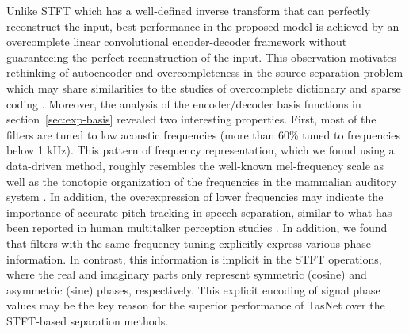 \documentclass[journal]{IEEEtran}
\begin{document}
Unlike STFT which has a well-defined inverse transform that can perfectly reconstruct the input, best performance in the proposed model is achieved by an overcomplete linear convolutional encoder-decoder framework without guaranteeing the perfect reconstruction of the input. This observation motivates rethinking of autoencoder and overcompleteness in the source separation problem which may share similarities to the studies of overcomplete dictionary and sparse coding \cite{lee1999blind, zibulevsky2001blind}. Moreover, the analysis of the encoder/decoder basis functions in section~\ref{sec:exp-basis} revealed two interesting properties. First, most of the filters are tuned to low acoustic frequencies (more than 60\% tuned to frequencies below 1 kHz). This pattern of frequency representation, which we found using a data-driven method, roughly resembles the well-known mel-frequency scale \cite{imai1983cepstral} as well as the tonotopic organization of the frequencies in the mammalian auditory system \cite{romani1982tonotopic, pantev1989tonotopic}. In addition, the overexpression of lower frequencies may indicate the importance of accurate pitch tracking in speech separation, similar to what has been reported in human multitalker perception studies \cite{darwin2003effects}. In addition, we found that filters with the same frequency tuning explicitly express various phase information. In contrast, this information is implicit in the STFT operations, where the real and imaginary parts only represent symmetric (cosine) and asymmetric (sine) phases, respectively. This explicit encoding of signal phase values may be the key reason for the superior performance of TasNet over the STFT-based separation methods.  
\end{document}
